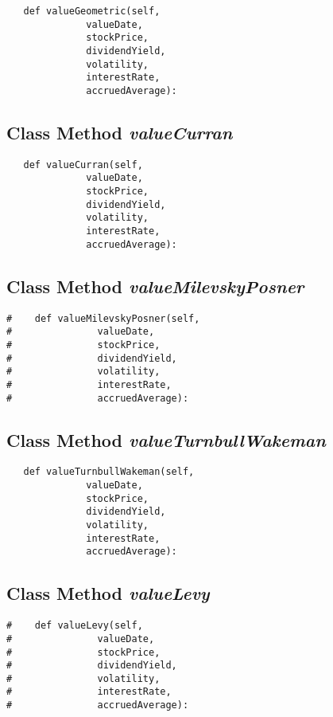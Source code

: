 \documentclass[twoside,11pt]{book}
\begin{document}
\begin{lstlisting}
   def valueGeometric(self,
              valueDate,
              stockPrice,
              dividendYield,
              volatility,
              interestRate,
              accruedAverage):
\end{lstlisting}

\subsection{Class Method {\it valueCurran}}


\begin{lstlisting}
   def valueCurran(self,
              valueDate,
              stockPrice,
              dividendYield,
              volatility,
              interestRate,
              accruedAverage):
\end{lstlisting}

\subsection{Class Method {\it valueMilevskyPosner}}


\begin{lstlisting}
#    def valueMilevskyPosner(self,
#               valueDate,
#               stockPrice,
#               dividendYield,
#               volatility,
#               interestRate,
#               accruedAverage):
\end{lstlisting}

\subsection{Class Method {\it valueTurnbullWakeman}}


\begin{lstlisting}
   def valueTurnbullWakeman(self,
              valueDate,
              stockPrice,
              dividendYield,
              volatility,
              interestRate,
              accruedAverage):
\end{lstlisting}

\subsection{Class Method {\it valueLevy}}


\begin{lstlisting}
#    def valueLevy(self,
#               valueDate,
#               stockPrice,
#               dividendYield,
#               volatility,
#               interestRate,
#               accruedAverage):
\end{lstlisting}
\end{document}
